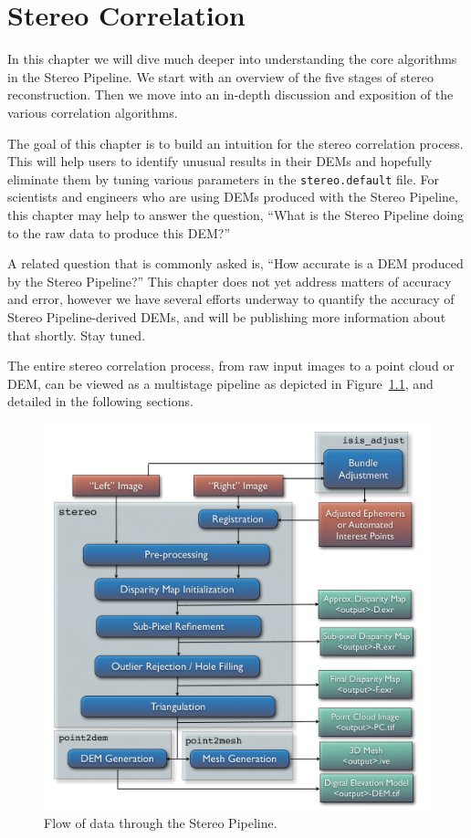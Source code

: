 \chapter{Stereo Correlation}
\label{ch:correlation}

In this chapter we will dive much deeper into understanding the core
algorithms in the Stereo Pipeline.  We start with an overview of the
five stages of stereo reconstruction.  Then we move into an in-depth
discussion and exposition of the various correlation algorithms.

The goal of this chapter is to build an intuition for the stereo
correlation process.  This will help users to identify unusual results
in their \acp{DEM} and hopefully eliminate them by tuning various
parameters in the \texttt{stereo.default} file.  For scientists and
engineers who are using \acp{DEM} produced with the Stereo Pipeline, this
chapter may help to answer the question, ``What is the Stereo Pipeline
doing to the raw data to produce this \ac{DEM}?''

A related question that is commonly asked is, ``How accurate is a \ac{DEM}
produced by the Stereo Pipeline?''  This chapter does not yet address
matters of accuracy and error, however we have several efforts underway
to quantify the accuracy of Stereo Pipeline-derived \acp{DEM}, and will be
publishing more information about that shortly.  Stay tuned.

The entire stereo correlation process, from raw input images to a
point cloud or DEM, can be viewed as a multistage pipeline as depicted
in Figure~\ref{fig:asp}, and detailed in the following sections.

\begin{figure}[tb]
  \centering
  \includegraphics[width=13cm]{images/asp}
  \caption{Flow of data through the Stereo Pipeline.}
  \label{fig:asp}
\end{figure}


